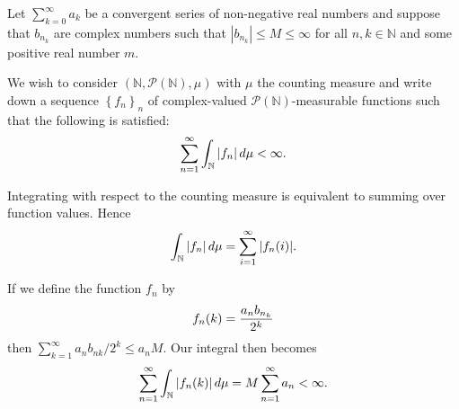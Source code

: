 \documentclass[a4paper, 10pt]{amsart}
\begin{document}
Let $ \sum^{\infty}_{k=0} a_k$ be a convergent series of non-negative real
numbers and suppose that $b_{n_k}$ are complex numbers such that $|b_{n_k}|
\leq M \le \infty$ for all $n, k \in \mathbb{N}$ and some positive real number
$m$.

We wish to consider $(\mathbb{N}, \mathcal{P}(\mathbb{N}), \mu)$ with $\mu$ the counting measure
and write down a sequence $\left\{f_n\right\}_{n}^{}$ of complex-valued $\mathcal{P}(\mathbb{N})$-measurable functions
such that the following is satisfied:
\begin{equation}
  \notag
  \sum^{\infty}_{n=1} \int_\mathbb{N}|f_n| \, d\mu < \infty.
\end{equation}

Integrating with respect to the counting measure is equivalent to summing over function values. Hence
\begin{equation}
  \notag
  \int_\mathbb{N}|f_n| \, d\mu = \sum^{\infty}_{i=1} |f_n(i)|.
\end{equation}

If we define the function $f_n$ by
\begin{equation}
  \notag
  f_n(k) = \frac{a_nb_{n_k}}{2^k}
\end{equation}
then $\sum^{\infty}_{k=1} a_nb_{nk}/2^k \leq a_nM$.  Our integral then becomes 
\begin{equation}
  \notag
  \sum^{\infty}_{n=1} \int_\mathbb{N}|f_n(k)| \, d\mu = M \sum^{\infty}_{n=1} a_n < \infty.
\end{equation}
\end{document}
